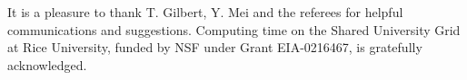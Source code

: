 \documentclass{ws-ijbc}
\begin{document}
 \noindent
It is a pleasure to thank T. Gilbert, Y. Mei and the referees
  for helpful communications and suggestions.
Computing time on the Shared University Grid at Rice University,
  funded by NSF under Grant EIA-0216467, is gratefully acknowledged.







%
%
%
\end{document}
